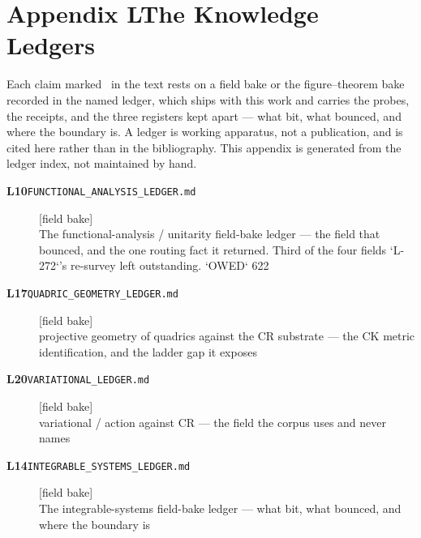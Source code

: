 \clearpage
\section*{Appendix L\quad The Knowledge Ledgers}\label{app:ledgers}
\small\noindent Each claim marked \ldgmarker\ in the text rests on a field bake or the figure--theorem bake recorded in the named ledger, which ships with this work and carries the probes, the receipts, and the three registers kept apart --- what bit, what bounced, and where the boundary is. A ledger is working apparatus, not a publication, and is cited here rather than in the bibliography. This appendix is generated from the ledger index, not maintained by hand.\par\medskip
\begingroup\renewcommand{\arraystretch}{1.25}
\begin{description}
\item[\textbf{L10}\quad\texttt{FUNCTIONAL\_ANALYSIS\_LEDGER.md}]\hfill\textsf{[field bake]}\\
The functional-analysis / unitarity field-bake ledger --- the field that bounced, and the one routing fact it returned. Third of the four fields `L-272`'s re-survey left outstanding. `OWED` 622
\item[\textbf{L17}\quad\texttt{QUADRIC\_GEOMETRY\_LEDGER.md}]\hfill\textsf{[field bake]}\\
projective geometry of quadrics against the CR substrate --- the CK metric identification, and the ladder gap it exposes
\item[\textbf{L20}\quad\texttt{VARIATIONAL\_LEDGER.md}]\hfill\textsf{[field bake]}\\
variational / action against CR --- the field the corpus uses and never names
\item[\textbf{L14}\quad\texttt{INTEGRABLE\_SYSTEMS\_LEDGER.md}]\hfill\textsf{[field bake]}\\
The integrable-systems field-bake ledger --- what bit, what bounced, and where the boundary is
\end{description}
\endgroup
